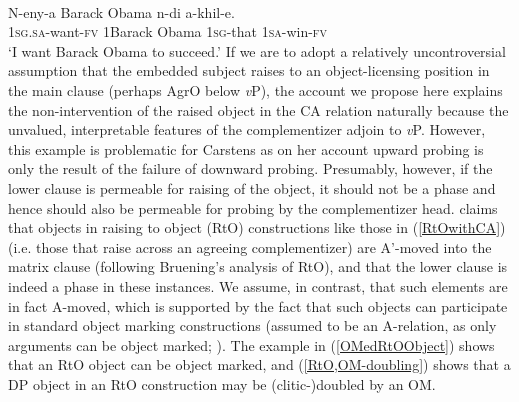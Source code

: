 \documentclass[output=paper
,modfonts
,nonflat
]{langsci/langscibook}
\begin{document}
\ea	\label{RtOwithCA}
 \\
\gll N-eny-a Barack Obama n-di a-khil-e.\\
1\textsc{sg}.\textsc{sa}-want-\textsc{fv} 1Barack Obama 1\textsc{sg}-that 1\textsc{sa}-win-\textsc{fv}\\
\glt `I want Barack Obama to succeed.'
\z
\noindent If we are to adopt a relatively uncontroversial assumption that the embedded subject raises to an object-licensing position in the main clause (perhaps AgrO below \textit{v}P), the account we propose here explains the non-intervention of the raised object in the CA relation naturally because the unvalued, interpretable features of the complementizer adjoin to \textit{v}P. However, this example is problematic for Carstens as on her account upward probing is only the result of the failure of downward probing. Presumably, however, if the lower clause is permeable for raising of the object, it should not be a phase and hence should also be permeable for probing by the complementizer head. \citeauthor{Carstens:2016} claims that objects in raising to object (RtO) constructions like those in (\ref{RtOwithCA}) (i.e. those that raise across an agreeing complementizer) are A’-moved into the matrix clause (following Bruening's \citeyear{Bruening:2001} analysis of RtO), and that the lower clause is indeed a phase in these instances. We assume, in contrast, that such elements are in fact A-moved, which is supported by the fact that such objects can participate in standard object marking constructions (assumed to be an A-relation, as only arguments can be object marked; \citealt{Diercks:2011,SikukuEt:2017}). The example in (\ref{OMedRtOObject}) shows that an RtO object can be object marked, and (\ref{RtO,OM-doubling}) shows that a DP object in an RtO construction may be (clitic-)doubled by an OM.%
\end{document}
